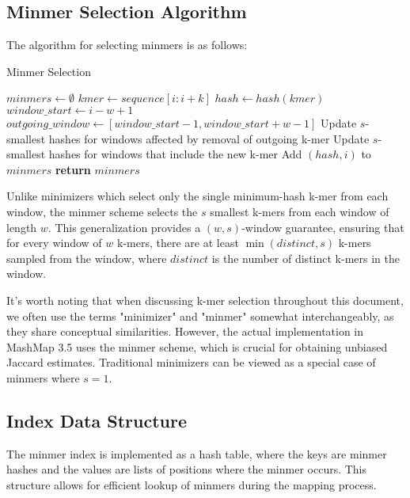 \documentclass{article}
\begin{document}
\subsection{Minmer Selection Algorithm}

The algorithm for selecting minmers is as follows:

\begin{algorithm}
\caption{Minmer Selection}
\begin{algorithmic}[1]
\State $minmers \gets \emptyset$
    \State $kmer \gets sequence[i:i+k]$
    \State $hash \gets hash(kmer)$
        \State $window\_start \gets i - w + 1$
        \State $outgoing\_window \gets [window\_start-1, window\_start+w-1]$
        \State Update $s$-smallest hashes for windows affected by removal of outgoing k-mer
    \EndIf
    \State Update $s$-smallest hashes for windows that include the new k-mer
            \State Add $(hash, i)$ to $minmers$
        \EndIf
    \EndFor
\EndFor
\State \textbf{return} $minmers$
\EndProcedure
\end{algorithmic}
\end{algorithm}

Unlike minimizers which select only the single minimum-hash k-mer from each window, the minmer scheme selects the $s$ smallest k-mers from each window of length $w$. This generalization provides a $(w,s)$-window guarantee, ensuring that for every window of $w$ k-mers, there are at least $\min(distinct, s)$ k-mers sampled from the window, where $distinct$ is the number of distinct k-mers in the window.

It's worth noting that when discussing k-mer selection throughout this document, we often use the terms "minimizer" and "minmer" somewhat interchangeably, as they share conceptual similarities. However, the actual implementation in MashMap 3.5 uses the minmer scheme, which is crucial for obtaining unbiased Jaccard estimates. Traditional minimizers can be viewed as a special case of minmers where $s=1$.

\subsection{Index Data Structure}

The minmer index is implemented as a hash table, where the keys are minmer hashes and the values are lists of positions where the minmer occurs. This structure allows for efficient lookup of minmers during the mapping process.
\end{document}

